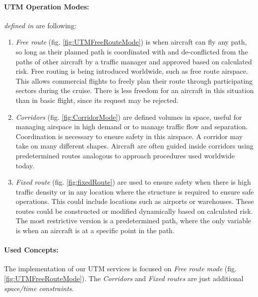 \paragraph{UTM Operation Modes:} \emph{defined in } \cite{airbusUTM2018blueprint} are following:
\begin{enumerate}
    \item \emph{Free route} (fig. \ref{fig:UTMFreeRouteMode}) is when aircraft can fly any path, so long as their planned path is coordinated with and de-conflicted from the paths of other aircraft by a traffic manager and approved based on calculated risk. Free routing is being introduced worldwide, such as free route airspace. This allows commercial flights to freely plan their route through participating sectors during the cruise. There is less freedom for an aircraft in this situation than in basic flight, since its request may be rejected.
    
    \item\emph{Corridors} (fig. \ref{fig:CorridorMode})  are defined volumes in space, useful for managing airspace in high demand or to manage traffic flow and separation. Coordination is necessary to ensure safety in this airspace. A corridor may take on many different shapes. Aircraft are often guided inside corridors using predetermined routes analogous to approach procedures used worldwide today.
    
    \item\emph{Fixed route} (fig. \ref{fig:fixedRoute}) are used to ensure safety when there is high traffic density or in any location where the structure is required to ensure safe operations. This could include locations such as airports or warehouses. These routes could be constructed or modified dynamically based on calculated risk. The most restrictive version is a predetermined path, where the only variable is when an aircraft is at a specific point in the path.
\end{enumerate}



\paragraph{Used Concepts:} The implementation of our UTM services  is focused on \emph{Free route mode} (fig. \ref{fig:UTMFreeRouteMode}). The \emph{Corridors} and \emph{Fixed routes} are just additional \emph{space/time constraints}.
